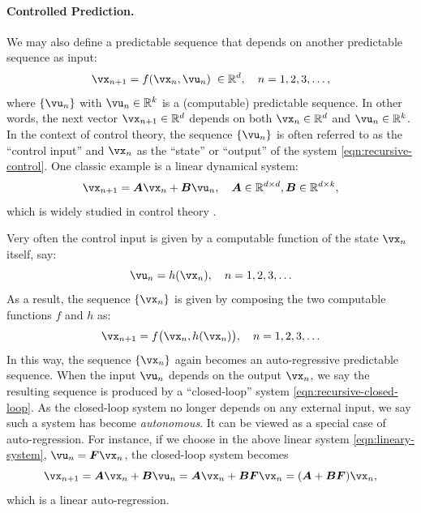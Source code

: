 \documentclass[../../book-main.tex]{subfiles}
\begin{document}
\paragraph{Controlled Prediction.}
We may also define a predictable sequence that depends on another predictable sequence as input:
\begin{equation}
    \vx_{n+1} = f(\vx_{n}, \vu_n) \; \in \mathbb{R}^d, \quad n =  1, 2, 3, \ldots,
\label{eqn:recursive-control}
\end{equation}
where $\{\vu_n\}$ with $\vu_n \in \mathbb{R}^k$ is a (computable) predictable sequence. In other words, the next vector $\vx_{n+1} \in \mathbb{R}^d$ depends on both $\vx_n \in \mathbb{R}^d$ and $\vu_n \in \mathbb{R}^k$. In the context of control theory, the sequence $\{\vu_n\}$ is often referred to as the ``control input'' and  $\vx_n$ as the ``state'' or ``output'' of the system \eqref{eqn:recursive-control}. One classic example is a linear dynamical system:
\begin{equation}
    \vx_{n+1} = \boldsymbol{A}\vx_n + \boldsymbol{B}\vu_n, \quad \boldsymbol{A} \in \mathbb{R}^{d\times d}, \boldsymbol{B} \in \mathbb{R}^{d\times k},
    \label{eqn:lineary-system} 
\end{equation}
which is widely studied in control theory \cite{Cal:Des}. 

Very often the control input is given by a computable function of the state $\vx_n$ itself, say: 
\begin{equation}
    \vu_n = h(\vx_n), \quad n =  1, 2, 3, \ldots 
\end{equation}
As a result, the sequence $\{\vx_n\}$ is given by composing the two computable functions $f$ and $h$ as:
\begin{equation}
    \vx_{n+1} = f\big(\vx_{n}, h(\vx_n)\big), \quad n =  1, 2, 3, \ldots
    \label{eqn:recursive-closed-loop}
\end{equation}
In this way, the sequence $\{\vx_n\}$ again becomes an auto-regressive predictable sequence.  When the input $\vu_n$ depends on the output $\vx_n$, we say the resulting sequence is produced by a ``closed-loop'' system \eqref{eqn:recursive-closed-loop}. As the closed-loop system no longer depends on any external input, we say such a system has become {\em autonomous}. It can be viewed as a special case of auto-regression. For instance, if we choose in the above linear system \eqref{eqn:lineary-system}, $\vu_n = \boldsymbol{F}\vx_n$, the closed-loop system becomes
\begin{equation}
        \vx_{n+1} = \boldsymbol{A}\vx_n + \boldsymbol{B}\vu_n = \boldsymbol{A}\vx_n + \boldsymbol{B}\boldsymbol{F}\vx_n = (\boldsymbol{A}+ \boldsymbol{B}\boldsymbol{F})\vx_n,
    \label{eqn:lineary-system-closed}
\end{equation}
which is a linear auto-regression. 
\end{document}
